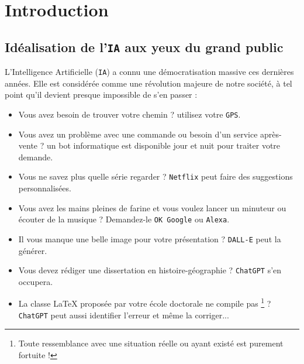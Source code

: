 \chapter{Introduction}
\label{chapter:1-INTRODUCTION}


	\section*{Idéalisation de l'\texttt{IA} aux yeux du grand public}
		
		L'Intelligence Artificielle (\texttt{IA}) a connu une démocratisation massive ces dernières années.
		Elle est considérée comme une révolution majeure de notre société, à tel point qu'il devient presque impossible de s'en passer :
		\begin{itemize}
			\item Vous avez besoin de trouver votre chemin ? utilisez votre \texttt{GPS}.
			\item Vous avez un problème avec une commande ou besoin d'un service après-vente ? un bot informatique est disponible jour et nuit pour traiter votre demande.
			\item Vous ne savez plus quelle série regarder ? \texttt{Netflix} peut faire des suggestions personnalisées.
			\item Vous avez les mains pleines de farine et vous voulez lancer un minuteur ou écouter de la musique ? Demandez-le \texttt{OK Google} ou \texttt{Alexa}.
			\item Il vous manque une belle image pour votre présentation ? \texttt{DALL-E} peut la générer.
			\item Vous devez rédiger une dissertation en histoire-géographie ? \texttt{ChatGPT} s'en occupera.
			\item La classe \LaTeX{} proposée par votre école doctorale ne compile pas \footnote{
				Toute ressemblance avec une situation réelle ou ayant existé est purement fortuite !
			} ? \texttt{ChatGPT} peut aussi identifier l'erreur et même la corriger...
		\end{itemize}
		
